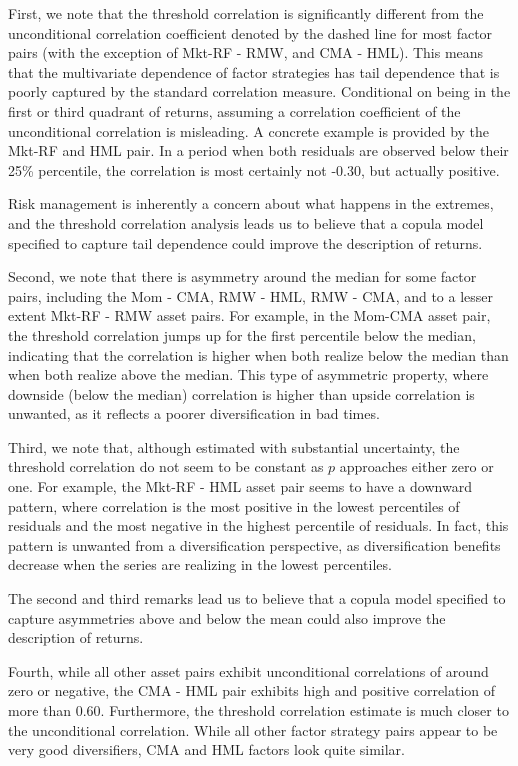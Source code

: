 First, we note that the threshold correlation is significantly different from the unconditional correlation coefficient denoted by the dashed line for most factor pairs (with the exception of Mkt-RF - RMW, and CMA - HML). This means that the multivariate dependence of factor strategies has tail dependence that is poorly captured by the standard correlation measure. Conditional on being in the first or third quadrant of returns, assuming a correlation coefficient of the unconditional correlation is misleading. A concrete example is provided by the Mkt-RF and HML pair. In a period when both residuals are observed below their 25\% percentile, the correlation is most certainly not -0.30, but actually positive.

Risk management is inherently a concern about what happens in the extremes, and the threshold correlation analysis leads us to believe that a copula model specified to capture tail dependence could improve the description of returns.

Second, we note that there is asymmetry around the median for some factor pairs, including the Mom - CMA, RMW - HML, RMW - CMA, and to a lesser extent Mkt-RF - RMW asset pairs. For example, in the Mom-CMA asset pair, the threshold correlation jumps up for the first percentile below the median, indicating that the correlation is higher when both realize below the median than when both realize above the median. This type of asymmetric property, where downside (below the median) correlation is higher than upside correlation is unwanted, as it reflects a poorer diversification in bad times. 

Third, we note that, although estimated with substantial uncertainty, the threshold correlation do not seem to be constant as $p$ approaches either zero or one. For example, the Mkt-RF - HML asset pair seems to have a downward pattern, where correlation is the most positive in the lowest percentiles of residuals and the most negative in the highest percentile of residuals. In fact, this pattern is unwanted from a diversification perspective, as diversification benefits decrease when the series are realizing in the lowest percentiles.

The second and third remarks lead us to believe that a copula model specified to capture asymmetries above and below the mean could also improve the description of returns.

Fourth, while all other asset pairs exhibit unconditional correlations of around zero or negative, the CMA - HML pair exhibits high and positive correlation of more than 0.60. Furthermore, the threshold correlation estimate is much closer to the unconditional correlation. While all other factor strategy pairs appear to be very good diversifiers, CMA and HML factors look quite similar.

